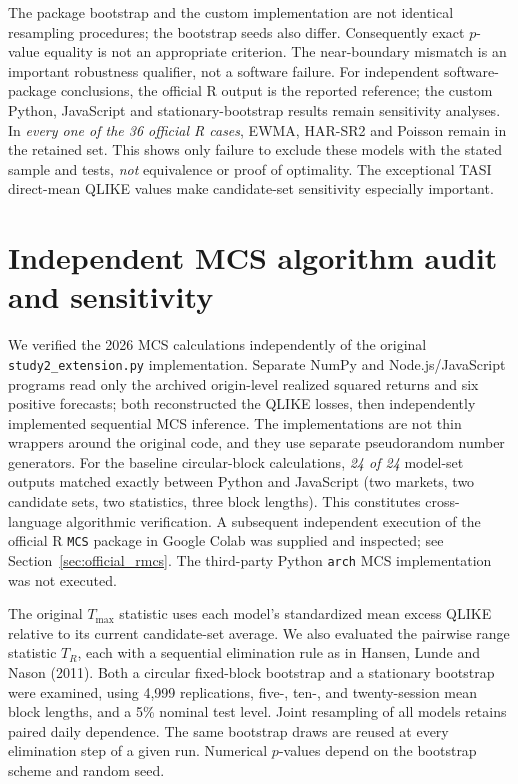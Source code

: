The package bootstrap and the custom implementation are not identical
resampling procedures; the bootstrap seeds also differ. Consequently exact
$p$-value equality is not an appropriate criterion. The near-boundary mismatch
is an important robustness qualifier, not a software failure. For independent
software-package conclusions, the official R output is the reported reference;
the custom Python, JavaScript and stationary-bootstrap results remain sensitivity
analyses. In \emph{every one of the 36 official R cases}, EWMA, HAR-SR2 and
Poisson remain in the retained set. This shows only failure to exclude these
models with the stated sample and tests, \emph{not} equivalence or proof of
optimality. The exceptional TASI direct-mean QLIKE values make candidate-set
sensitivity especially important.


\FloatBarrier
\section{Independent MCS algorithm audit and sensitivity}\label{sec:independent_mcs}
We verified the 2026 MCS calculations independently of the original
\texttt{study2\_}\allowbreak\texttt{extension.py} implementation. Separate NumPy and Node.js/JavaScript
programs read only the archived origin-level realized squared returns and six
positive forecasts; both reconstructed the QLIKE losses, then independently
implemented sequential MCS inference. The implementations are not thin wrappers
around the original code, and they use separate pseudorandom number generators.
For the baseline circular-block calculations, \emph{24 of 24} model-set outputs
matched exactly between Python and JavaScript (two markets, two candidate sets,
two statistics, three block lengths). This constitutes cross-language algorithmic
verification. A subsequent independent execution of the official R \texttt{MCS}
package in Google Colab was supplied and inspected; see Section~\ref{sec:official_rmcs}.
The third-party Python \texttt{arch} MCS implementation was not executed.

The original $T_{\max}$ statistic uses each model's standardized mean excess
QLIKE relative to its current candidate-set average. We also evaluated the
pairwise range statistic $T_R$, each with a sequential elimination rule as in
Hansen, Lunde and Nason (2011). Both a circular fixed-block bootstrap and a
stationary bootstrap were examined, using 4,999 replications, five-, ten-, and
twenty-session mean block lengths, and a 5\% nominal test level. Joint resampling
of all models retains paired daily dependence. The same bootstrap draws are
reused at every elimination step of a given run. Numerical $p$-values depend
on the bootstrap scheme and random seed.

